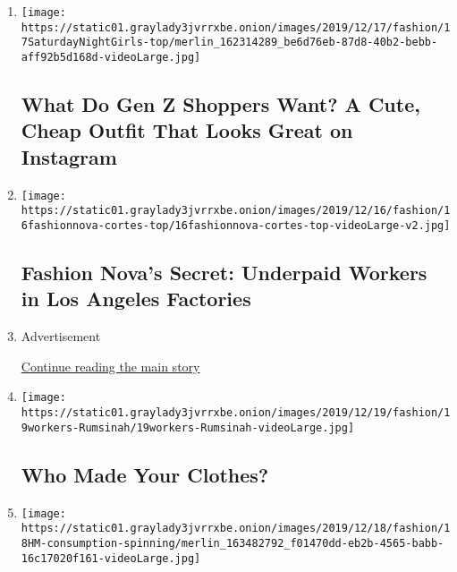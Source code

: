 \begin{enumerate}
\def\labelenumi{\arabic{enumi}.}
\item
  \texttt{[image: https://static01.graylady3jvrrxbe.onion/images/2019/12/17/fashion/17SaturdayNightGirls-top/merlin\_162314289\_be6d76eb-87d8-40b2-bebb-aff92b5d168d-videoLarge.jpg]}

  \href{/2019/12/17/style/fast-fashion-gen-z.html}{}

  \hypertarget{what-do-gen-z-shoppers-want-a-cute-cheap-outfit-that-looks-great-on-instagram}{%
  \subsection{What Do Gen Z Shoppers Want? A Cute, Cheap Outfit That
  Looks Great on
  Instagram}\label{what-do-gen-z-shoppers-want-a-cute-cheap-outfit-that-looks-great-on-instagram}}
\item
  \texttt{[image: https://static01.graylady3jvrrxbe.onion/images/2019/12/16/fashion/16fashionnova-cortes-top/16fashionnova-cortes-top-videoLarge-v2.jpg]}

  \href{/2019/12/16/business/fashion-nova-underpaid-workers.html}{}

  \hypertarget{fashion-novas-secret-underpaid-workers-in-los-angeles-factories}{%
  \subsection{Fashion Nova's Secret: Underpaid Workers in Los Angeles
  Factories}\label{fashion-novas-secret-underpaid-workers-in-los-angeles-factories}}
\item
  Advertisement

  \protect\hyperlink{after-mid1}{Continue reading the main story}
\item
  \texttt{[image: https://static01.graylady3jvrrxbe.onion/images/2019/12/19/fashion/19workers-Rumsinah/19workers-Rumsinah-videoLarge.jpg]}

  \href{/2019/12/19/style/garment-workers-around-the-world.html}{}

  \hypertarget{who-made-your-clothes}{%
  \subsection{Who Made Your Clothes?}\label{who-made-your-clothes}}
\item
  \texttt{[image: https://static01.graylady3jvrrxbe.onion/images/2019/12/18/fashion/18HM-consumption-spinning/merlin\_163482792\_f01470dd-eb2b-4565-babb-16c17020f161-videoLarge.jpg]}


\end{enumerate}
